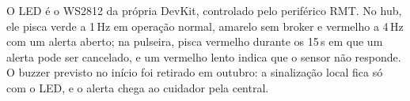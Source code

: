 O LED é o WS2812 da própria DevKit, controlado pelo periférico RMT. No hub, ele pisca verde a
1\,Hz em operação normal, amarelo sem broker e vermelho a 4\,Hz com um alerta aberto; na
pulseira, pisca vermelho durante os 15\,s em que um alerta pode ser cancelado, e um vermelho
lento indica que o sensor não responde. O buzzer previsto no início foi retirado em outubro:
a sinalização local fica só com o LED, e o alerta chega ao cuidador pela central.
